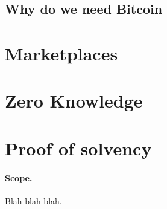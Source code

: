 
    
    

    



\subsection{Why do we need Bitcoin}


\section{Marketplaces}

\section{Zero Knowledge}

\section{Proof of solvency}


 

\paragraph{Scope.} 
Blah blah blah.




